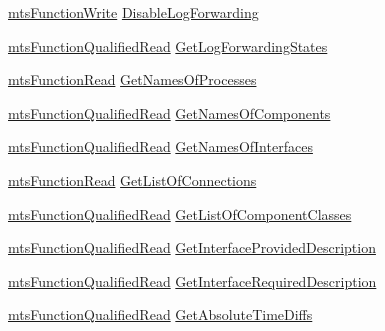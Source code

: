\begin{DoxyCompactItemize}
\item 
\hyperlink{classmts_function_write}{mts\+Function\+Write} \hyperlink{structmts_manager_component_client_1_1_interface_l_c_m_function_type_a53dd8af09a194f08f5bfa76661902ebb}{Disable\+Log\+Forwarding}
\item 
\hyperlink{classmts_function_qualified_read}{mts\+Function\+Qualified\+Read} \hyperlink{structmts_manager_component_client_1_1_interface_l_c_m_function_type_ad56a5bbc25eca92858ac6f81fa4b13d7}{Get\+Log\+Forwarding\+States}
\item 
\hyperlink{classmts_function_read}{mts\+Function\+Read} \hyperlink{structmts_manager_component_client_1_1_interface_l_c_m_function_type_ad640c4356d85cbd0e9988774c514d478}{Get\+Names\+Of\+Processes}
\item 
\hyperlink{classmts_function_qualified_read}{mts\+Function\+Qualified\+Read} \hyperlink{structmts_manager_component_client_1_1_interface_l_c_m_function_type_a179c57f73f4d15b4a6b0590a4e3c4064}{Get\+Names\+Of\+Components}
\item 
\hyperlink{classmts_function_qualified_read}{mts\+Function\+Qualified\+Read} \hyperlink{structmts_manager_component_client_1_1_interface_l_c_m_function_type_a782d881b9f81be71a60fda623594fcad}{Get\+Names\+Of\+Interfaces}
\item 
\hyperlink{classmts_function_read}{mts\+Function\+Read} \hyperlink{structmts_manager_component_client_1_1_interface_l_c_m_function_type_ac92cc2d929605d96bb2b33bdc056e46b}{Get\+List\+Of\+Connections}
\item 
\hyperlink{classmts_function_qualified_read}{mts\+Function\+Qualified\+Read} \hyperlink{structmts_manager_component_client_1_1_interface_l_c_m_function_type_a434d2629f88f0683c504a505b8e6aec5}{Get\+List\+Of\+Component\+Classes}
\item 
\hyperlink{classmts_function_qualified_read}{mts\+Function\+Qualified\+Read} \hyperlink{structmts_manager_component_client_1_1_interface_l_c_m_function_type_a605b54d29d4d2b3aa3fa0a001886c1fa}{Get\+Interface\+Provided\+Description}
\item 
\hyperlink{classmts_function_qualified_read}{mts\+Function\+Qualified\+Read} \hyperlink{structmts_manager_component_client_1_1_interface_l_c_m_function_type_af9337bd1144ed982e167e9ffb5935b09}{Get\+Interface\+Required\+Description}
\item 
\hyperlink{classmts_function_qualified_read}{mts\+Function\+Qualified\+Read} \hyperlink{structmts_manager_component_client_1_1_interface_l_c_m_function_type_a88d6e6e708c8e530d70df57375435d2b}{Get\+Absolute\+Time\+Diffs}
\end{DoxyCompactItemize}


